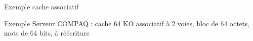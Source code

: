 %
\begin{Frame}{Exemple cache associatif}

      \begin{block}{Exemple Serveur COMPAQ : cache 64 KO associatif à 2 voies, bloc de 64 octets, mots de 64 bits, à réécriture}
      \end{block}   

\vspace{-0.85cm}
        \begin{center}
        \end{center}
      
\end{Frame}


